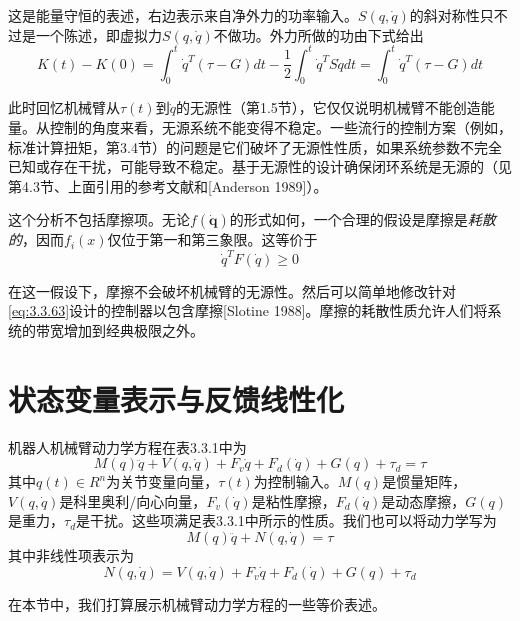 \documentclass[12pt,a4paper]{ctexart}
\begin{document}
这是能量守恒的表述，右边表示来自净外力的功率输入。$S(q,\dot{q})$的斜对称性只不过是一个陈述，即虚拟力$S(q,\dot{q})$不做功。外力所做的功由下式给出
\begin{equation}\label{eq:3.3.66}
K(t) - K(0) = \int_0^t \dot{q}^T(\tau - G) dt - \frac{1}{2}\int_0^t \dot{q}^T S \dot{q} dt = \int_0^t \dot{q}^T(\tau - G) dt
\end{equation}

此时回忆机械臂从$\tau(t)$到$\dot{q}$的无源性（第1.5节），它仅仅说明机械臂不能创造能量。从控制的角度来看，无源系统不能变得不稳定。一些流行的控制方案（例如，标准计算扭矩，第3.4节）的问题是它们破坏了无源性性质，如果系统参数不完全已知或存在干扰，可能导致不稳定。基于无源性的设计确保闭环系统是无源的（见第4.3节、上面引用的参考文献和[Anderson 1989]）。

这个分析不包括摩擦项。无论$f(\dot{\mathbf{q}})$的形式如何，一个合理的假设是摩擦是\emph{耗散的}，因而$f_i(x)$仅位于第一和第三象限。这等价于
\begin{equation}\label{eq:3.3.67}
\dot{q}^T F(\dot{q}) \geq 0
\end{equation}

在这一假设下，摩擦不会破坏机械臂的无源性。然后可以简单地修改针对\eqref{eq:3.3.63}设计的控制器以包含摩擦[Slotine 1988]。摩擦的耗散性质允许人们将系统的带宽增加到经典极限之外。

\section{状态变量表示与反馈线性化}

机器人机械臂动力学方程在表3.3.1中为
\begin{equation}\label{eq:3.4.1}
M(q)\ddot{q} + V(q,\dot{q}) + F_v\dot{q} + F_d(\dot{q}) + G(q) + \tau_d = \tau
\end{equation}
其中$q(t) \in R^n$为关节变量向量，$\tau(t)$为控制输入。$M(q)$是惯量矩阵，$V(q,\dot{q})$是科里奥利/向心向量，$F_v(\dot{q})$是粘性摩擦，$F_d(\dot{q})$是动态摩擦，$G(q)$是重力，$\tau_d$是干扰。这些项满足表3.3.1中所示的性质。我们也可以将动力学写为
\begin{equation}\label{eq:3.4.2}
M(q)\ddot{q} + N(q,\dot{q}) = \tau
\end{equation}
其中非线性项表示为
\begin{equation}
N(q,\dot{q}) = V(q,\dot{q}) + F_v\dot{q} + F_d(\dot{q}) + G(q) + \tau_d
\end{equation}

在本节中，我们打算展示机械臂动力学方程的一些等价表述。
\end{document}
